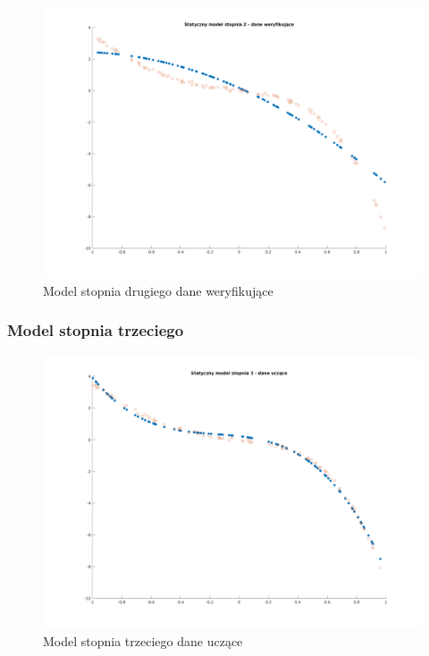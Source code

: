 \documentclass[a4paper, 11pt]{article}
\begin{document}
\begin{figure}[H]
\centering
\includegraphics[scale=0.50]{dane_stat_2_wer.png}
\caption{Model stopnia drugiego dane weryfikujące}
\label{}
\end{figure}

\subsubsection{Model stopnia trzeciego}
\begin{figure}[H]
\centering
\includegraphics[scale=0.50]{dane_stat_3_ucz.png}
\caption{Model stopnia trzeciego dane uczące}
\label{}
\end{figure}
\end{document}
